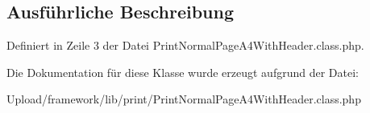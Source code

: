 \subsection{Ausführliche Beschreibung}


Definiert in Zeile 3 der Datei Print\+Normal\+Page\+A4\+With\+Header.\+class.\+php.



Die Dokumentation für diese Klasse wurde erzeugt aufgrund der Datei\+:\begin{DoxyCompactItemize}
\item 
Upload/framework/lib/print/Print\+Normal\+Page\+A4\+With\+Header.\+class.\+php\end{DoxyCompactItemize}

